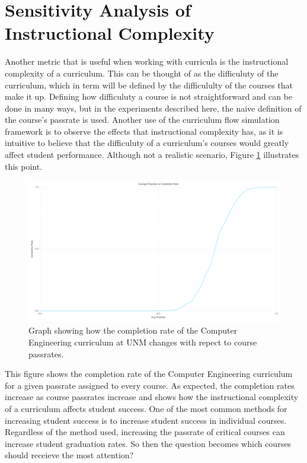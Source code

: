 \documentclass[botnum, fleqn]{unmeethesis}
\begin{document}
\section{Sensitivity Analysis of Instructional Complexity}

Another metric that is useful when working with curricula is the instructional complexity of a curriculum. This can be thought of as the difficuluty of the curriculum, which in term will be defined by the difficululty of the courses that make it up. Defining how difficuluty a course is not straightforward and can be done in many ways, but in the experiments described here, the naive definition of the course's passrate is used. Another use of the curriculum flow simulation framework is to observe the effects that instructional complexity has, as it is intuitive to believe that the difficuluty of a curriculum's courses would greatly affect student performance. Although not a realistic scenario, Figure \ref{fig:instructional} illustrates this point.

\begin{figure}[h!]
\centerline{\includegraphics[scale=0.2]{./figures/instructional.png}}
\caption{Graph showing how the completion rate of the Computer Engineering curriculum at UNM changes with repect to course passrates.} 
\label{fig:instructional}
\end{figure}

This figure shows the completion rate of the Computer Engineering curriculum for a given passrate assigned to every course. As expected, the completion rates increase as course passrates increase and shows how the instructional complexity of a curriculum affects student success. One of the most common methods for increasing student success is to increase student success in individual courses. Regardless of the method used, increasing the passrate of critical courses can increase student graduation rates. So then the question becomes which courses should receieve the most attention?
\end{document}
